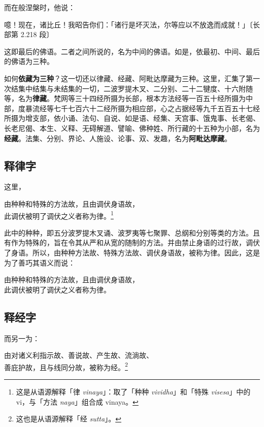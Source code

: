 而在般涅槃时，他说：

\begin{quoting}噫！现在，诸比丘！我昭告你们：「诸行是坏灭法，尔等应以不放逸而成就！」{\bluefootnotesize 〔长部第 2.218 段〕}\end{quoting}

这即最后的佛语。二者之间所说的，名为中间的佛语。如是，依最初、中间、最后的佛语为三种。

如何\textbf{依藏为三种}？这一切还以律藏、经藏、阿毗达摩藏为三种。这里，汇集了第一次结集中结集与未结集的一切，二波罗提木叉、二分别、二十二犍度、十六附随等，名为\textbf{律藏}。梵网等三十四经所摄为长部，根本方法经等一百五十经所摄为中部，度暴流经等七千七百六十二经所摄为相应部，心之占据经等九千五百五十七经所摄为增支部，依小诵、法句、自说、如是语、经集、天宫事、饿鬼事、长老偈、长老尼偈、本生、义释、无碍解道、譬喻、佛种姓、所行藏的十五种为小部，名为\textbf{经藏}。法集、分别、界论、人施设、论事、双、发趣，名为\textbf{阿毗达摩藏}。

\subsection*{释律字}

这里，

\begin{quoting}由种种和特殊的方法故，且由调伏身语故，\\此调伏被明了调伏之义者称为律。\footnote{这是从语源解释「律 \textit{vinaya}」：取了「种种 \textit{vividha}」和「特殊 \textit{visesa}」中的 vi，与「方法 \textit{naya}」组合成 vinaya。}\end{quoting}

此中的种种，即五分波罗提木叉诵、波罗夷等七聚罪、总纲和分别等类的方法。且有作为特殊的，旨在令其从严和从宽的随制的方法。并由禁止身语的过行故，调伏了身语。所以，由种种方法故、特殊方法故、调伏身语故，被称为律。因此，这是为了善巧其语义而说：

\begin{quoting}由种种和特殊的方法故，且由调伏身语故，\\此调伏被明了调伏之义者称为律。\end{quoting}

\subsection*{释经字}

而另一为：

\begin{quoting}由对诸义利指示故、善说故、产生故、流淌故、\\善庇护故，且与线同分故，被称为经。\footnote{这也是从语源解释「经 \textit{sutta}」。}\end{quoting}

